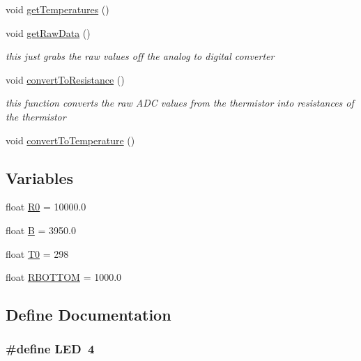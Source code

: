 \begin{CompactItemize}
void \hyperlink{temperature__sensor___terciopelo_8pde_ea28af0c7128421a38589128bb39ef1c}{getTemperatures} ()
\item 
void \hyperlink{temperature__sensor___terciopelo_8pde_cfc975251dbc3a8c9a9b11f8df62cc41}{getRawData} ()
\begin{CompactList}\small\item\em this just grabs the raw values off the analog to digital converter \item\end{CompactList}\item 
void \hyperlink{temperature__sensor___terciopelo_8pde_8e666a34a083b1806167ca991be0c436}{convertToResistance} ()
\begin{CompactList}\small\item\em this function converts the raw ADC values from the thermistor into resistances of the thermistor \item\end{CompactList}\item 
void \hyperlink{temperature__sensor___terciopelo_8pde_3aa4f99331713009a70ee34eba83754b}{convertToTemperature} ()
\end{CompactItemize}
\subsection*{Variables}
\begin{CompactItemize}
\item 
float \hyperlink{temperature__sensor___terciopelo_8pde_735577560ca40e5b6008a98829068904}{R0} = 10000.0
\item 
float \hyperlink{temperature__sensor___terciopelo_8pde_8188fea1f6709096fe21a3ee084d00d0}{B} = 3950.0
\item 
float \hyperlink{temperature__sensor___terciopelo_8pde_4211ba1269f650e21964d32238a460b2}{T0} = 298
\item 
float \hyperlink{temperature__sensor___terciopelo_8pde_d17df5990b551ac9e97a3d60f65833ff}{RBOTTOM} = 1000.0
\end{CompactItemize}


\subsection{Define Documentation}
\hypertarget{temperature__sensor___terciopelo_8pde_eb7a7ba1ab7e0406f1b5ab36d579f585}{
\subsubsection[{LED}]{\setlength{\rightskip}{0pt plus 5cm}\#define LED~4}}
\label{temperature__sensor___terciopelo_8pde_eb7a7ba1ab7e0406f1b5ab36d579f585}




